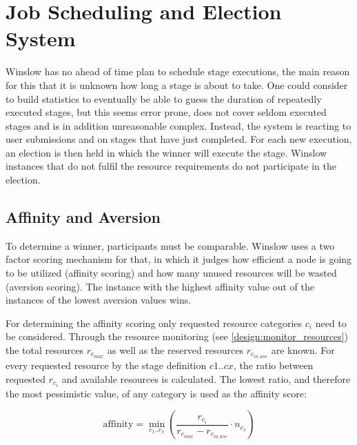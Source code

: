 


\section{Job Scheduling and Election System}
\label{design:election}

Winslow has no ahead of time plan to schedule stage executions, the main reason for this that it is unknown how long a stage is about to take.
One could consider to build statistics to eventually be able to guess the duration of repeatedly executed stages, but this seems error prone, does not cover seldom executed stages and is in addition unreasonable complex.
Instead, the system is reacting to user submissions and on stages that have just completed.
For each new execution, an election is then held in which the winner will execute the stage.
Winslow instances that do not fulfil the resource requirements do not participate in the election.

\subsection{Affinity and Aversion}
\label{election:affinity_and_aversion}

To determine a winner, participants must be comparable.
Winslow uses a two factor scoring mechanism for that, in which it judges how efficient a node is going to be utilized (affinity scoring) and how many unused resources will be wasted (aversion scoring).
The instance with the highest affinity value out of the instances of the lowest aversion values wins.

For determining the affinity scoring only requested resource categories $c_i$ need to be considered.
Through the resource monitoring (see \autoref{design:monitor_resources}) the total resources $r_{c_{max}}$ as well as the reserved resources $r_{c_{in\_use}}$ are known.
For every requested resource by the stage definition $c1 .. cx$, the ratio between requested $r_{c_i}$ and available resources is calculated.
The lowest ratio, and therefore the most pessimistic value, of any category is used as the affinity score:

\begin{equation}
	\label{election:eq:affinity}
	\text{affinity} = \min_{c_1 .. c_x} \left( \frac{r_{c_i}}{r_{c_{max}} - r_{c_{in\_use}}} \cdot n_{c_x} \right)
\end{equation}

